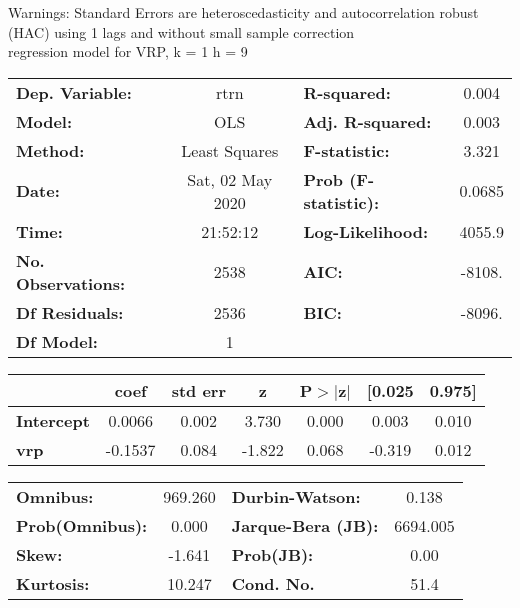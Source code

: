 Warnings: \newline
 [1] Standard Errors are heteroscedasticity and autocorrelation robust (HAC) using 1 lags and without small sample correction\\ 

regression model for VRP, k = 1 h = 9\begin{center}
\begin{tabular}{lclc}
\toprule
\textbf{Dep. Variable:}    &       rtrn       & \textbf{  R-squared:         } &     0.004   \\
\textbf{Model:}            &       OLS        & \textbf{  Adj. R-squared:    } &     0.003   \\
\textbf{Method:}           &  Least Squares   & \textbf{  F-statistic:       } &     3.321   \\
\textbf{Date:}             & Sat, 02 May 2020 & \textbf{  Prob (F-statistic):} &   0.0685    \\
\textbf{Time:}             &     21:52:12     & \textbf{  Log-Likelihood:    } &    4055.9   \\
\textbf{No. Observations:} &        2538      & \textbf{  AIC:               } &    -8108.   \\
\textbf{Df Residuals:}     &        2536      & \textbf{  BIC:               } &    -8096.   \\
\textbf{Df Model:}         &           1      & \textbf{                     } &             \\
\bottomrule
\end{tabular}
\begin{tabular}{lcccccc}
                   & \textbf{coef} & \textbf{std err} & \textbf{z} & \textbf{P$> |$z$|$} & \textbf{[0.025} & \textbf{0.975]}  \\
\midrule
\textbf{Intercept} &       0.0066  &        0.002     &     3.730  &         0.000        &        0.003    &        0.010     \\
\textbf{vrp}       &      -0.1537  &        0.084     &    -1.822  &         0.068        &       -0.319    &        0.012     \\
\bottomrule
\end{tabular}
\begin{tabular}{lclc}
\textbf{Omnibus:}       & 969.260 & \textbf{  Durbin-Watson:     } &    0.138  \\
\textbf{Prob(Omnibus):} &   0.000 & \textbf{  Jarque-Bera (JB):  } & 6694.005  \\
\textbf{Skew:}          &  -1.641 & \textbf{  Prob(JB):          } &     0.00  \\
\textbf{Kurtosis:}      &  10.247 & \textbf{  Cond. No.          } &     51.4  \\
\bottomrule
\end{tabular}
\end{center}

